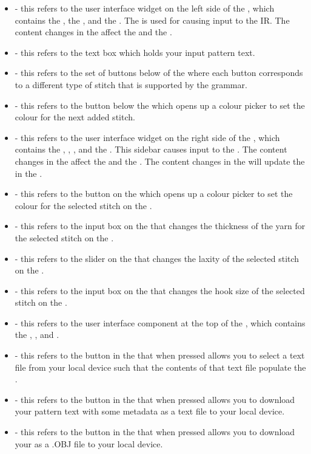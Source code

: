 \documentclass[main.tex]{subfiles}
\begin{document}
\begin{itemize}
\item \PatSidebar{} - this refers to the user interface widget on the left side of the \CRW, which contains the \PTI, the \ASBs, and the \NCSB. The \PatSidebar{} is used for causing input to the IR. The content changes in the \PatSidebar{} affect the \RM{} and the \CRW.
\item \PTI{} - this refers to the text box which holds your input pattern text.
\item \ASBs{} - this refers to the set of buttons below of the \PTI{} where each button corresponds to a different type of stitch that is supported by the grammar.
\item \NCSB{} - this refers to the button below the \ASBs{} which opens up a colour picker to set the colour for the next added stitch.
\item \PropSidebar{} - this refers to the user interface widget on the right side of the \CRW, which contains the \YCP, \YTS, \SLS, and the \HSS. This sidebar causes input to the \IR. The content changes in the \PropSidebar{} affect the \RM{} and the \CRW. The content changes in the \PropSidebar{} will update the \PTI{} in the \PatSidebar{}.
\item \YCP{} - this refers to the button on the \PropSidebar{} which opens up a colour picker to set the colour for the selected stitch on the \RM.
\item \YTS{} - this refers to the input box on the \PropSidebar{} that changes the thickness of the yarn for the selected stitch on the \RM.
\item \SLS{} - this refers to the slider on the \PropSidebar{} that changes the laxity of the selected stitch on the \RM.
\item \HSS{} - this refers to the input box on the \PropSidebar{} that changes the hook size of the selected stitch on the \RM.
\item \MenuBar{} - this refers to the user interface component at the top of the \CRW, which contains the \UB, \DB, and \EB.
\item \UB{} - this refers to the button in the \MenuBar{} that when pressed allows you to select a text file from your local device such that the contents of that text file populate the \PTI.
\item \DB{} - this refers to the button in the \MenuBar{} that when pressed allows you to download your pattern text with some metadata as a text file to your local device.
\item \EB{} - this refers to the button in the \MenuBar{} that when pressed allows you to download your \RM{} as a .OBJ file to your local device.

\end{itemize}
\end{document}
